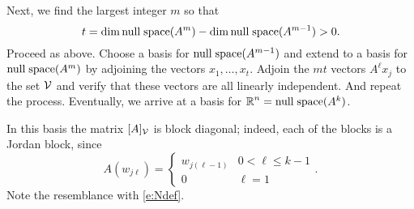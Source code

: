 \documentclass{ximera}
\begin{document}
Next, we find the largest integer $m$ so that 
\[
t=\dim{\rm null\;space}(A^m)-\dim{\rm null\;space}(A^{m-1})>0.
\]
Proceed as above.  Choose a basis for ${\rm null\;space}(A^{m-1})$ and extend to a basis 
for ${\rm null\;space}(A^m)$ by adjoining the vectors $x_1,\ldots,x_t$.  Adjoin the $mt$ 
vectors $A^\ell x_j$ to the set ${\cal V}$ and verify that these vectors are 
all linearly independent.  And repeat the process.  Eventually, we arrive at 
a basis for $\mbox{$\Bbb{R}$}^n={\rm null\;space}(A^k)$.  

In this basis the matrix $[A]_{\cal V}$ is block diagonal; indeed, each of 
the blocks is a Jordan block, since 
\[
A(w_{j\ell}) = \left\{\begin{array}{cl}w_{j(\ell-1)} & 0<\ell\le k-1\\ 0 & 
\ell=1 \end{array}\right. .
\]
Note the resemblance with \eqref{e:Ndef}.
\end{document}
